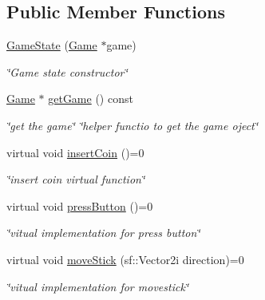 \subsection*{Public Member Functions}
\begin{DoxyCompactItemize}
\item 
\hyperlink{classGameState_ab0a50af4416535fc9ed4462015de9bc3}{Game\+State} (\hyperlink{classGame}{Game} $\ast$game)
\begin{DoxyCompactList}\small\item\em \char`\"{}\+Game state constructor\char`\"{} \end{DoxyCompactList}\item 
\mbox{\label{classGameState_a7f1afbce585f48311006ddb00c26e32f}} 
\hyperlink{classGame}{Game} $\ast$ \hyperlink{classGameState_a7f1afbce585f48311006ddb00c26e32f}{get\+Game} () const
\begin{DoxyCompactList}\small\item\em \char`\"{}get the game\char`\"{}  \char`\"{}helper functio to get the game oject\char`\"{} \end{DoxyCompactList}\item 
\mbox{\label{classGameState_a4cd6f5b4ad23fc08dca287df26d94b94}} 
virtual void \hyperlink{classGameState_a4cd6f5b4ad23fc08dca287df26d94b94}{insert\+Coin} ()=0
\begin{DoxyCompactList}\small\item\em \char`\"{}insert coin virtual function\char`\"{} \end{DoxyCompactList}\item 
\mbox{\label{classGameState_aa14eeaf244bcf19b7013af75cb722dde}} 
virtual void \hyperlink{classGameState_aa14eeaf244bcf19b7013af75cb722dde}{press\+Button} ()=0
\begin{DoxyCompactList}\small\item\em \char`\"{}vitual implementation for press button\char`\"{} \end{DoxyCompactList}\item 
\mbox{\label{classGameState_afb05bd19a9c5cf27f6923b52f1ffc17b}} 
virtual void \hyperlink{classGameState_afb05bd19a9c5cf27f6923b52f1ffc17b}{move\+Stick} (sf\+::\+Vector2i direction)=0
\begin{DoxyCompactList}\small\item\em \char`\"{}vitual implementation for movestick\char`\"{} \end{DoxyCompactList}\item 

\end{DoxyCompactItemize}
